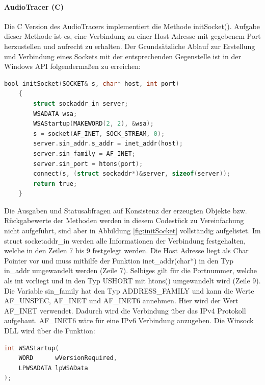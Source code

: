 \paragraph{AudioTracer (C)}

Die C Version des AudioTracers implementiert die Methode initSocket(). Aufgabe dieser Methode ist es, eine Verbindung zu einer Host Adresse mit gegebenem Port herzustellen und aufrecht zu erhalten. Der Grundsätzliche Ablauf zur Erstellung und Verbindung eines Sockets mit der entsprechenden Gegenstelle ist in der Windows API folgendermaßen zu erreichen:

\begin{lstlisting}[language=C, frame=none]
	bool initSocket(SOCKET& s, char* host, int port)
	{
		struct sockaddr_in server;
		WSADATA wsa;
		WSAStartup(MAKEWORD(2, 2), &wsa);
		s = socket(AF_INET, SOCK_STREAM, 0);
		server.sin_addr.s_addr = inet_addr(host);
		server.sin_family = AF_INET;
		server.sin_port = htons(port);
		connect(s, (struct sockaddr*)&server, sizeof(server));
		return true;
	}
\end{lstlisting}

Die Ausgaben und Statusabfragen auf Konsistenz der erzeugten Objekte bzw. Rückgabewerte der Methoden werden in diesem Codestück zu Vereinfachung nicht aufgeführt, sind aber in Abbildung \ref{fig:initSocket} vollständig aufgelistet. Im struct socketaddr\_in werden alle Informationen der Verbindung festgehalten, welche in den Zeilen 7 bis 9 festgelegt werden. Die Host Adresse liegt als Char Pointer vor und muss mithilfe der Funktion inet\_addr(char*) in den Typ in\_addr umgewandelt werden (Zeile 7). Selbiges gilt für die Portnummer, welche als int vorliegt und in den Typ USHORT mit htons() umgewandelt wird (Zeile 9). Die Variable sin\_family hat den Typ ADDRESS\_FAMILY und kann die Werte AF\_UNSPEC, AF\_INET und AF\_INET6 annehmen. Hier wird der Wert AF\_INET verwendet. Dadurch wird die Verbindung über das IPv4 Protokoll aufgebaut. AF\_INET6 wäre für eine IPv6 Verbindung anzugeben.
Die Winsock DLL wird über die Funktion:
\begin{lstlisting}[language=C, frame=none]
	int WSAStartup(
	WORD      wVersionRequired,
	LPWSADATA lpWSAData
);
\end{lstlisting}

